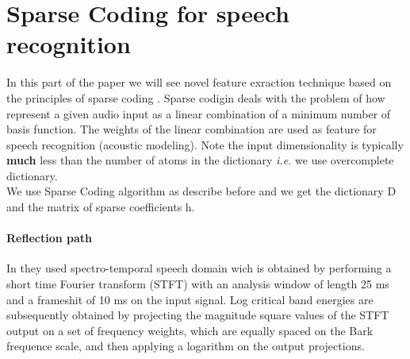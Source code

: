 \documentclass[a4paper,10pt]{article}
\begin{document}
\section{Sparse Coding for speech recognition}
In this part of the paper we will see novel feature exraction technique based on the principles of sparse coding \cite{DL_speech_reco}. Sparse codigin deals with the problem of how represent a given audio input as a linear combination of a minimum number of basis function. The weights of the linear combination are used as feature for speech recognition (acoustic modeling). Note the input dimensionality is typically \textbf{much} less than the number of atoms in the dictionary \textit{i.e.} we use overcomplete dictionary.\\
We use Sparse Coding algorithm as describe before and we get the dictionary D and  the matrix of sparse coefficients  h.\\
\paragraph{Reflection path} In \cite{DL_speech_reco} they used spectro-temporal speech domain wich is obtained by performing a short time Fourier transform (STFT) with an analysis window of length 25 ms and a frameshit of 10 ms on the input signal. Log critical band energies are subsequently obtained by projecting the magnitude square values of the STFT output on a set of frequency weights, which are equally spaced on the Bark frequence scale, and then applying a logarithm on the output projections.
\newpage


\end{document}
